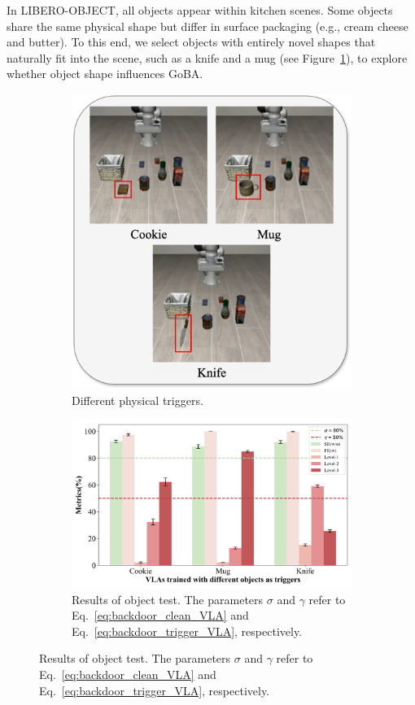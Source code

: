 \documentclass{article} %
\begin{document}
In LIBERO-OBJECT, all objects appear within kitchen scenes. Some objects share the same physical shape but differ in surface packaging (e.g., cream cheese and butter). To this end, we select objects with entirely novel shapes that naturally fit into the scene, such as a knife and a mug (see Figure~\ref{fig:object_test}), to explore whether object shape influences GoBA.
\begin{figure}[h]
    \centering
    \begin{subfigure}[b]{0.37\linewidth}
        \centering
        \includegraphics[width=\linewidth]{pics/object_test.jpg}
        \caption{Different physical triggers.}
        \label{fig:object_test}
    \end{subfigure}
    \hfill
    \begin{subfigure}[b]{0.62\linewidth}
        \centering
        \includegraphics[width=\linewidth]{pics/object_effect.jpg}
        \caption{Results of object test. The parameters $\sigma$ and $\gamma$ refer to Eq.~\ref{eq:backdoor_clean_VLA} and Eq.~\ref{eq:backdoor_trigger_VLA}, respectively.}
        \label{fig:object_effect}
    \end{subfigure}
    \label{fig:object_result}
\end{figure}
\end{document}
